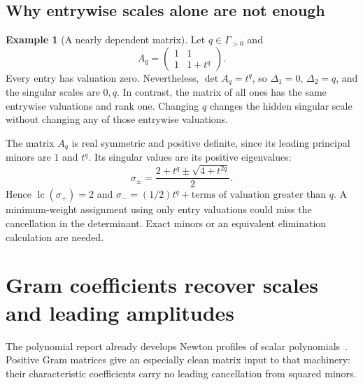 \documentclass[11pt,a4paper]{article}
\numberwithin{equation}{section}
\theoremstyle{definition}
\newtheorem{example}[example]{Example}
\theoremstyle{remark}
\newcommand{\lc}{\operatorname{lc}}
\begin{document}
\subsection{Why entrywise scales alone are not enough}
\begin{example}[A nearly dependent matrix]\label{ex:near}
Let $q\in\Gamma_{>0}$ and
\[
 A_q=\begin{pmatrix}1&1\\1&1+t^q\end{pmatrix}.
\]
Every entry has valuation zero. Nevertheless,
$\det A_q=t^q$, so $\Delta_1=0$, $\Delta_2=q$, and the singular scales are
$0,q$. In contrast, the matrix of all ones has the same entrywise valuations
and rank one. Changing $q$ changes the hidden singular scale without
changing any of those entrywise valuations.

The matrix $A_q$ is real symmetric and positive definite, since its leading
principal minors are $1$ and $t^q$. Its singular values are its positive
eigenvalues:
\[
 \sigma_\pm=\frac{2+t^q\pm\sqrt{4+t^{2q}}}{2}.
\]
Hence $\lc(\sigma_+)=2$ and
$\sigma_-=(1/2)t^q+\text{terms of valuation greater than }q$.
A minimum-weight assignment using only entry valuations could miss the
cancellation in the determinant. Exact minors or an equivalent elimination
calculation are needed.
\end{example}

\section{Gram coefficients recover scales and leading amplitudes}\label{sec:gram}

The polynomial report already develops Newton profiles of scalar
polynomials~\cite{RepoPoly}. Positive Gram matrices give an especially
clean matrix input to that machinery: their characteristic coefficients
carry no leading cancellation from squared minors.
\end{document}
